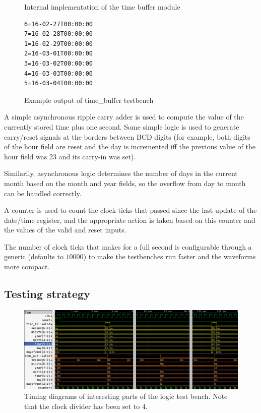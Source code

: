 \documentclass[a4paper]{article}
\begin{document}
\begin{figure}
\begin{minipage}{11cm}
\begin{tikzpicture}
		\end{tikzpicture}
		\caption{Internal implementation of the time buffer module}
		\label{time_buffer_block}
	\end{minipage}
	\begin{minipage}{5cm}
\begin{verbatim}
6=16-02-27T00:00:00
7=16-02-28T00:00:00
1=16-02-29T00:00:00
2=16-03-01T00:00:00
3=16-03-02T00:00:00
4=16-03-03T00:00:00
5=16-03-04T00:00:00
\end{verbatim}
		\caption{Example output of time\_buffer testbench}
		\label{time_buffer_text}
	\end{minipage}
\end{figure}

A simple asynchronous ripple carry adder is used to compute the value of the
currently stored time plus one second. Some simple logic is used to generate
carry/reset signals at the borders between BCD digits (for example, both digits
of the hour field are reset and the day is incremented iff the previous value
of the hour field was 23 and its carry-in was set).

Similarily, asynchronous logic determines the number of days in the current
month based on the month and year fields, so the overflow from day to month can
be handled correctly.

A counter is used to count the clock ticks that passed since the last update of
the date/time register, and the appropriate action is taken based on this
counter and the values of the valid and reset inputs.

The number of clock ticks that makes for a full second is configurable through
a generic (defaults to $10000$) to make the testbenches run faster and the
waveforms more compact.

\subsection{Testing strategy}

\begin{figure}
	\centering
	\includegraphics[width=\textwidth]{time_buffer_timing.png}
	\caption{Timing diagrams of interesting parts of the logic test bench. Note that the clock divider has been set to 4.}
	\label{time_buffer_timing}
\end{figure}
\end{document}
